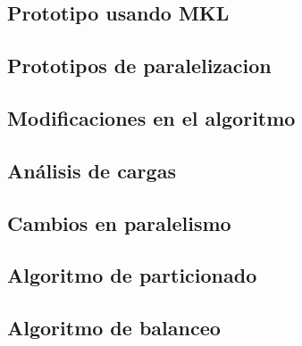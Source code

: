 \subsection{Prototipo usando MKL}

\subsection{Prototipos de paralelizacion}

\subsection{Modificaciones en el algoritmo}

\subsection{An\'alisis de cargas}

\subsection{Cambios en paralelismo}

\subsection{Algoritmo de particionado}

\subsection{Algoritmo de balanceo}
